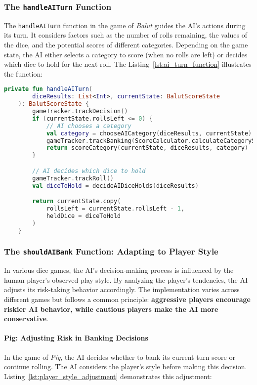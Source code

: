 \subsubsection{The \texttt{handleAITurn} Function}

The \texttt{handleAITurn} function in the game of \emph{Balut} guides the AI's actions during its turn. It considers factors such as the number of rolls remaining, the values of the dice, and the potential scores of different categories. Depending on the game state, the AI either selects a category to score (when no rolls are left) or decides which dice to hold for the next roll. The Listing~\ref{lst:ai_turn_function}  illustrates the function:

\begin{lstlisting}[language=Kotlin, caption={handleAITurn Function}, label=lst:ai_turn_function]
    private fun handleAITurn(
        diceResults: List<Int>, currentState: BalutScoreState
    ): BalutScoreState {
        gameTracker.trackDecision()
        if (currentState.rollsLeft <= 0) {
            // AI chooses a category
            val category = chooseAICategory(diceResults, currentState)
            gameTracker.trackBanking(ScoreCalculator.calculateCategoryScore(diceResults, category))
            return scoreCategory(currentState, diceResults, category)
        }

        // AI decides which dice to hold
        gameTracker.trackRoll()
        val diceToHold = decideAIDiceHolds(diceResults)

        return currentState.copy(
            rollsLeft = currentState.rollsLeft - 1,
            heldDice = diceToHold
        )
    }
\end{lstlisting}

\subsubsection{The \texttt{shouldAIBank} Function: Adapting to Player Style}

In various dice games, the AI's decision-making process is influenced by the human player's observed play style. By analyzing the player's tendencies, the AI adjusts its risk-taking behavior accordingly. The implementation varies across different games but follows a common principle: \textbf{aggressive players encourage riskier AI behavior, while cautious players make the AI more conservative}.

\paragraph{Pig: Adjusting Risk in Banking Decisions}  
In the game of \emph{Pig}, the AI decides whether to bank its current turn score or continue rolling. The AI considers the player's style before making this decision. Listing~\ref{lst:player_style_adjustment} demonstrates this adjustment:

